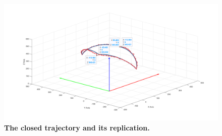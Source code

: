 \begin{figure}[H] %
    \centering 
    \captionsetup{labelsep=colon}
    \includegraphics[width=1.0\textwidth]{Image/Result/circle_trajectory_replication_with_label.png} 
    \caption[The closed trajectory and its replication by FABRIKc algorithm]
    {\centering \textbf{The closed trajectory and its replication.}}
    \label{fig:clc_cross}
\end{figure}
